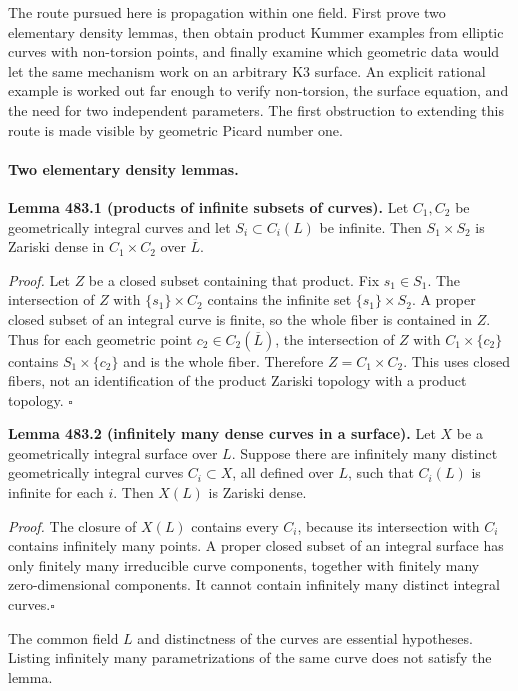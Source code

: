\documentclass[11pt]{article}
\begin{document}
The route pursued here is propagation within one field. First prove two
elementary density lemmas, then obtain product Kummer examples from
elliptic curves with non-torsion points, and finally examine which geometric
data would let the same mechanism work on an arbitrary K3 surface. An
explicit rational example is worked out far enough to verify non-torsion,
the surface equation, and the need for two independent parameters.
The first obstruction to extending this route is made visible by geometric
Picard number one.

\paragraph{Two elementary density lemmas.}
\textbf{Lemma 483.1 (products of infinite subsets of curves).}
Let $C_1,C_2$ be geometrically integral curves and let
$S_i\subset C_i(L)$ be infinite. Then $S_1\times S_2$ is Zariski dense
in $C_1\times C_2$ over $\overline L$.

\emph{Proof.}
Let $Z$ be a closed subset containing that product. Fix $s_1\in S_1$.
The intersection of $Z$ with $\{s_1\}\times C_2$ contains the infinite
set $\{s_1\}\times S_2$. A proper closed subset of an integral curve
is finite, so the whole fiber is contained in $Z$. Thus for each geometric
point $c_2\in C_2(\overline L)$, the intersection of $Z$ with
$C_1\times\{c_2\}$ contains $S_1\times\{c_2\}$ and is the whole
fiber. Therefore $Z=C_1\times C_2$. This uses closed fibers, not an
identification of the product Zariski topology with a product topology.
\hfill$\square$

\textbf{Lemma 483.2 (infinitely many dense curves in a surface).}
Let $X$ be a geometrically integral surface over $L$. Suppose there are
infinitely many distinct geometrically integral curves $C_i\subset X$,
all defined over $L$, such that $C_i(L)$ is infinite for each $i$.
Then $X(L)$ is Zariski dense.

\emph{Proof.}
The closure of $X(L)$ contains every $C_i$, because its intersection with
$C_i$ contains infinitely many points. A proper closed subset of an
integral surface has only finitely many irreducible curve components,
together with finitely many zero-dimensional components. It cannot
contain infinitely many distinct integral curves.\hfill$\square$

The common field $L$ and distinctness of the curves are essential
hypotheses. Listing infinitely many parametrizations of the same curve
does not satisfy the lemma.
\end{document}
